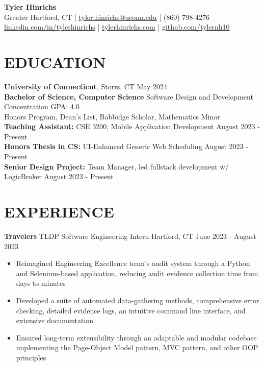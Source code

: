 \documentclass[a4paper,10pt]{extarticle}
\begin{document}
\pagestyle{empty}

\begin{center}
\textbf{\Large Tyler Hinrichs}\\[2pt] %
Greater Hartford, CT | \href{mailto:tyler.hinrichs@uconn.edu}{tyler.hinrichs@uconn.edu} | (860) 798-4276\\ \href{https://www.linkedin.com/in/tylerhinrichs}{linkedin.com/in/tylerhinrichs} | \href{https://tylerhinrichs.com}{tylerhinrichs.com} | \href{https://github.com/tylernh10}{github.com/tylernh10} %
\end{center}

\section*{EDUCATION}
\noindent
\textbf{University of Connecticut}, Storrs, CT \hfill May 2024\\ %
\textbf{Bachelor of Science, Computer Science} \textbar \space Software Design and Development Concentration \hfill GPA: 4.0 \\ %
\null \qquad Honors Program, Dean’s List, Babbidge Scholar, Mathematics Minor \\
\textbf{Teaching Assistant:} CSE 3200, Mobile Application Development \hfill August 2023 - Present \\
\textbf{Honors Thesis in CS:} UI-Enhanced Generic Web Scheduling \hfill August 2023 - Present \\
\textbf{Senior Design Project:} Team Manager, led fullstack development w/ LogicBroker \hfill August 2023 - Present


\section*{EXPERIENCE}
\noindent
\textbf{Travelers} \textbar \space TLDP Software Engineering Intern \hfill Hartford, CT \textbar \space June 2023 - August 2023 %
\begin{itemize}
    \item Reimagined Engineering Excellence team's audit system through a Python and Selenium-based application, reducing audit evidence collection time from days to minutes
    \item Developed a suite of automated data-gathering methods, comprehensive error checking, detailed evidence logs, an intuitive command line interface, and extensive documentation
    \item Ensured long-term extensibility through an adaptable and modular codebase implementing the Page-Object Model pattern, MVC pattern, and other OOP principles%
\end{itemize}
\end{document}
